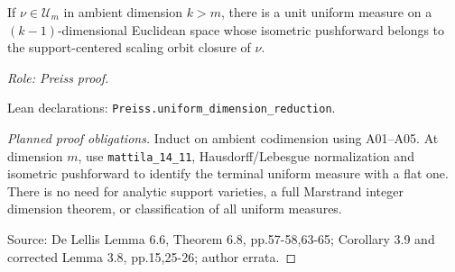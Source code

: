 \begin{lemma}
\label{lem:uniform-reduction}






If $\nu\in\mathcal U_m$ in ambient dimension $k>m$, there is a unit uniform measure on a $(k-1)$-dimensional Euclidean space whose isometric pushforward belongs to the support-centered scaling orbit closure of $\nu$.
\par\emph{Role: Preiss proof.}
\par Lean declarations: \texttt{Preiss.uniform\_dimension\_reduction}.
\end{lemma}
\begin{proof}[Planned proof obligations]

Induct on ambient codimension using A01--A05. At dimension $m$, use
\texttt{mattila\_14\_11}, Hausdorff/Lebesgue normalization and isometric
pushforward to identify the terminal uniform measure with a flat one.
There is no need for analytic support varieties, a full Marstrand integer
dimension theorem, or classification of all uniform measures.
\par Source: De Lellis Lemma 6.6, Theorem 6.8, pp.57-58,63-65; Corollary 3.9 and corrected Lemma 3.8, pp.15,25-26; author errata.
\end{proof}

